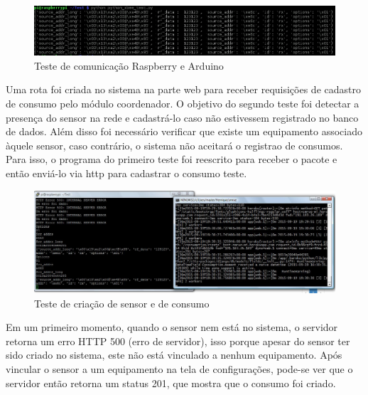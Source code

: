 



\begin{figure}[H]
\centering
\includegraphics[width=1\textwidth]{figuras/teste-inicial-raspberry-arduino.png}
\caption{\label{fig:raspberry-arduino-1} Teste de comunicação Raspberry e Arduino}
\end{figure}

Uma rota foi criada no sistema na parte web para receber requisições de cadastro de consumo pelo módulo coordenador. O objetivo do segundo teste foi detectar a presença do sensor na rede e cadastrá-lo caso não estivessem registrado no banco de dados. Além disso foi necessário verificar que existe um equipamento associado àquele sensor, caso contrário, o sistema não aceitará o registrao de consumos.
Para isso, o programa do primeiro teste foi reescrito para receber o pacote e então enviá-lo via http para cadastrar o consumo teste.

\begin{figure}[H]
\centering
\includegraphics[width=1\textwidth]{figuras/sensor_creation.jpg}
\caption{\label{fig:sensor_creation} Teste de criação de sensor e de consumo }
\end{figure}

Em um primeiro momento, quando o sensor nem está no sistema,  o servidor retorna um erro HTTP 500 (erro de servidor), isso porque apesar do sensor ter sido criado no sistema, este não está vinculado a nenhum equipamento. Após vincular o sensor a um equipamento na tela de configurações, pode-se ver que o servidor então retorna um status 201, que mostra que o consumo foi criado.

